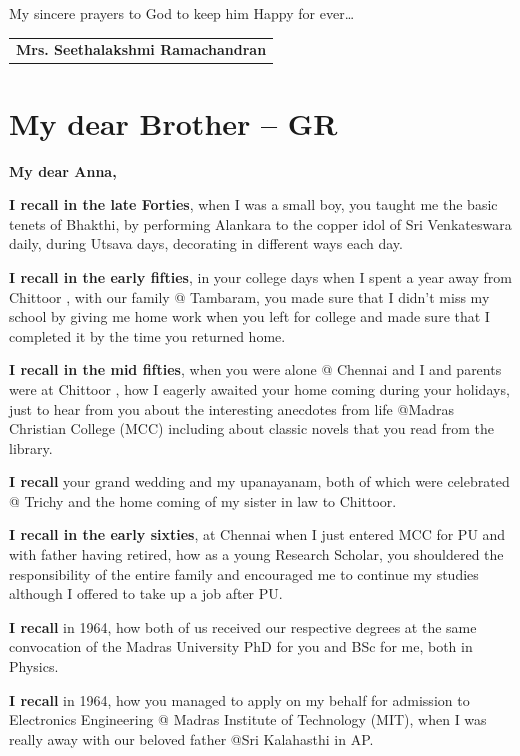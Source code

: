 My sincere prayers to God to keep him Happy for ever…
\bigskip

\begin{flushright}
\begin{tabular}{c}
\multicolumn{1}{p{2cm}}{\textbf{Mrs. Seethalakshmi Ramachandran}}
\end{tabular}
\end{flushright}

\newpage

\section*{ My dear Brother – GR}

\noindent \textbf{My dear Anna,}

\textbf{I recall in the late Forties}, when I was a small boy, you taught me the basic tenets of Bhakthi, by performing Alankara to the copper idol of Sri Venkateswara daily, during Utsava days, decorating in different ways each day.

\textbf{I recall in the early fifties}, in your college days when I spent a year away from Chittoor , with our family @ Tambaram, you made sure that I didn’t miss my school by giving me home work when you left for college and made sure that I completed it by the time you returned home.

\textbf{I recall in the mid fifties}, when you were alone @ Chennai and I and parents were at Chittoor , how I eagerly awaited your home coming during your holidays, just to hear from you about the interesting anecdotes from life @Madras Christian  College (MCC) including about classic novels that you read from the library.

\textbf{I recall} your grand wedding and my upanayanam, both of which were celebrated @ Trichy and the home coming of my sister in law to Chittoor.

\textbf{I recall in the early sixties}, at Chennai when I just entered MCC for PU and with father having retired, how as a young Research Scholar, you shouldered the responsibility of the entire family and encouraged me to continue my studies although I offered to take up a job after PU.

\textbf{I recall} in 1964, how both of us received our respective degrees at the same convocation of the Madras University PhD for you and BSc for me, both in Physics.

\textbf{I recall} in 1964, how you managed to apply on my behalf for admission to Electronics Engineering @ Madras Institute of Technology (MIT), when I was really away with our beloved father @Sri Kalahasthi in AP.

